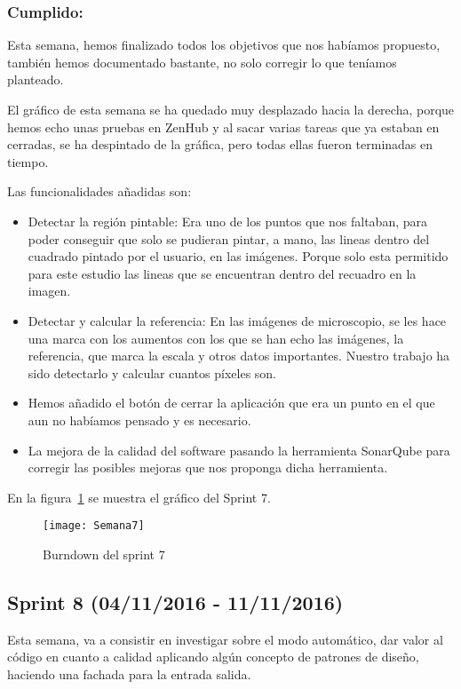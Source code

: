 \subsubsection{Cumplido:}
Esta semana, hemos finalizado todos los objetivos que nos habíamos propuesto, también hemos documentado bastante, no solo corregir lo que teníamos planteado.

El gráfico de esta semana se ha quedado muy desplazado hacia la derecha, porque hemos echo unas pruebas en ZenHub y al sacar varias tareas que ya estaban en cerradas, se ha despintado de la gráfica, pero todas ellas fueron terminadas en tiempo.

Las funcionalidades añadidas son:
\begin{itemize}
	\item Detectar la región pintable: Era uno de los puntos que nos faltaban, para poder conseguir que solo se pudieran pintar, a mano, las lineas dentro del cuadrado pintado por el usuario, en las imágenes. Porque solo esta permitido para este estudio las lineas que se encuentran dentro del recuadro en la imagen.
	\item Detectar y calcular la referencia: En las imágenes de microscopio, se les hace una marca con los aumentos con los que se han echo las imágenes, la referencia, que marca la escala y otros datos importantes.
	Nuestro trabajo ha sido detectarlo y calcular cuantos píxeles son.
	
	\item Hemos añadido el botón de cerrar la aplicación que era un punto en el que aun no habíamos pensado y es necesario.
	
	\item La mejora de la calidad del software pasando la herramienta SonarQube para corregir las posibles mejoras que nos proponga dicha herramienta. 
\end{itemize}

En la figura~\ref{fig:A.2.7} se muestra el gráfico del Sprint 7.

\begin{figure}[h]
\centering
\texttt{[image: Semana7]}
\caption{Burndown del sprint 7}
\label{fig:A.2.7}
\end{figure}

\subsection{Sprint 8 (04/11/2016 - 11/11/2016)}
Esta semana, va a consistir en investigar sobre el modo automático, dar valor al código en cuanto a calidad aplicando algún concepto de patrones de diseño, haciendo una fachada para la entrada salida.

